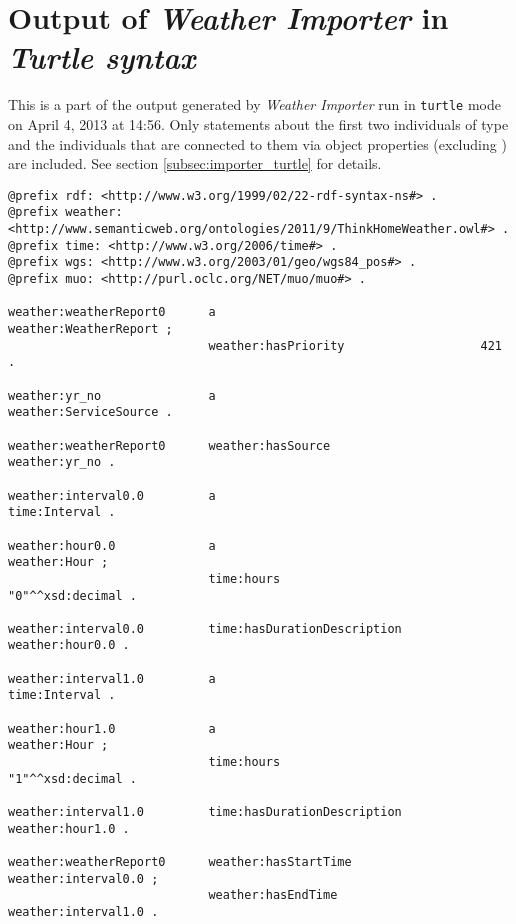 \section{Output of \emph{Weather Importer} in \emph{Turtle syntax}}
\label{sec:appendix_turtle_output}

This is a part of the output generated by \emph{Weather Importer} run in \texttt{turtle} mode on April 4, 2013 at 14:56. Only statements about the first two individuals of type  and the individuals that are connected to them via object properties (excluding )  are included. See section \ref{subsec:importer_turtle} for details.

\vspace{1em}

\begin{lstlisting}
@prefix rdf: <http://www.w3.org/1999/02/22-rdf-syntax-ns#> .
@prefix weather: <http://www.semanticweb.org/ontologies/2011/9/ThinkHomeWeather.owl#> .
@prefix time: <http://www.w3.org/2006/time#> .
@prefix wgs: <http://www.w3.org/2003/01/geo/wgs84_pos#> .
@prefix muo: <http://purl.oclc.org/NET/muo/muo#> .

weather:weatherReport0      a                                     weather:WeatherReport ;
                            weather:hasPriority                   421 .

weather:yr_no               a                                     weather:ServiceSource .

weather:weatherReport0      weather:hasSource                     weather:yr_no .

weather:interval0.0         a                                     time:Interval .

weather:hour0.0             a                                     weather:Hour ;
                            time:hours                            "0"^^xsd:decimal .

weather:interval0.0         time:hasDurationDescription           weather:hour0.0 .

weather:interval1.0         a                                     time:Interval .

weather:hour1.0             a                                     weather:Hour ;
                            time:hours                            "1"^^xsd:decimal .

weather:interval1.0         time:hasDurationDescription           weather:hour1.0 .

weather:weatherReport0      weather:hasStartTime                  weather:interval0.0 ;
                            weather:hasEndTime                    weather:interval1.0 .


\end{lstlisting}
